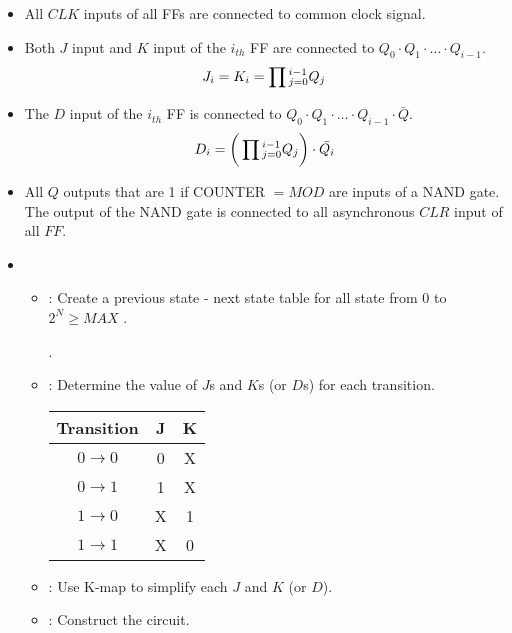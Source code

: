 \begin{multicols}{3}
      \begin{itemize}
        \item {}
          \par All $CLK$ inputs of all FFs are connected to  common
            clock signal.
        \item {}
          \par Both $J$ input and $K$ input of the $i_{th}$ FF are connected to
            $Q_{0} \cdot Q_{1} \cdot \ldots \cdot Q_{i - 1}$.
            \begin{equation}
              J_{i} = K_{i} = \prod \limits{_{j = 0}^{i - 1} Q_{j}}
            \end{equation}
        \item {}
          \par The $D$ input of the $i_{th}$ FF is connected to
            $Q_{0} \cdot Q_{1} \cdot \ldots \cdot Q_{i - 1} \cdot \bar{Q}$.
            \begin{equation}
              D_{i} = \bigg( \prod \limits{_{j = 0}^{i - 1} Q_{j}} \bigg) \cdot \bar{Q_{i}}
            \end{equation}
        \item {}
          \par All $Q$ outputs that are 1 if COUNTER $= MOD$ are inputs of a NAND gate.
            The output of the NAND gate is connected to all asynchronous $CLR$ input
            of all $FF$.
        \item {}
          \begin{itemize}
            \item {}: Create a previous state - next state table for all
              state from $0$ to $2^{N} \geq MAX$ .
              \par {}.
            \item {}: Determine the value of $J$s and $K$s (or $D$s) for
              each transition.
                \begin{tabular}{|c|c|c|}
                  \hline
                  \textbf{Transition} & \textbf{J} & \textbf{K} \\ \hline
                  $0 \to 0$           & 0          & X          \\ \hline
                  $0 \to 1$           & 1          & X          \\ \hline
                  $1 \to 0$           & X          & 1          \\ \hline
                  $1 \to 1$           & X          & 0          \\ \hline      
                \end{tabular}
            \item {}: Use K-map to simplify each $J$ and $K$ (or $D$).
            \item {}: Construct the circuit.
          \end{itemize}
      \end{itemize}


\end{multicols}